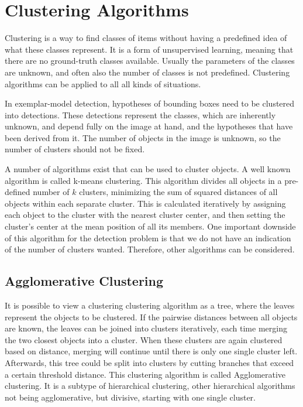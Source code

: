 \section{Clustering Algorithms} %
\label{sub:clustering_algorithms}

Clustering is a way to find classes of items without having a predefined idea of what these classes represent. It is a form of unsupervised learning, meaning that there are no ground-truth classes available. Usually the parameters of the classes are unknown, and often also the number of classes is not predefined. Clustering algorithms can be applied to all all kinds of situations.

In exemplar-model detection, hypotheses of bounding boxes need to be clustered into detections. These detections represent the classes, which are inherently unknown, and depend fully on the image at hand, and the hypotheses that have been derived from it. The number of objects in the image is unknown, so the number of clusters should not be fixed.

A number of algorithms exist that can be used to cluster objects. A well known algorithm is called k-means clustering. This algorithm divides all objects in a pre-defined number of $k$ clusters, minimizing the sum of squared distances of all objects within each separate cluster. This is calculated iteratively by assigning each object to the cluster with the nearest cluster center, and then setting the cluster's center at the mean position of all its members. One important downside of this algorithm for the detection problem is that we do not have an indication of the number of clusters wanted. Therefore, other algorithms can be considered.


\subsection{Agglomerative Clustering} %
\label{sub:agglomerative_clustering}
It is possible to view a clustering clustering algorithm as a tree, where the leaves represent the objects to be clustered. If the pairwise distances between all objects are known, the leaves can be joined into clusters iteratively, each time merging the two closest objects into a cluster. When these clusters are again clustered based on distance, merging will continue until there is only one single cluster left. Afterwards, this tree could be split into clusters by cutting branches that exceed a certain threshold distance. This clustering algorithm is called Agglomerative clustering. It is a subtype of hierarchical clustering, other hierarchical algorithms not being agglomerative, but divisive, starting with one single cluster.

